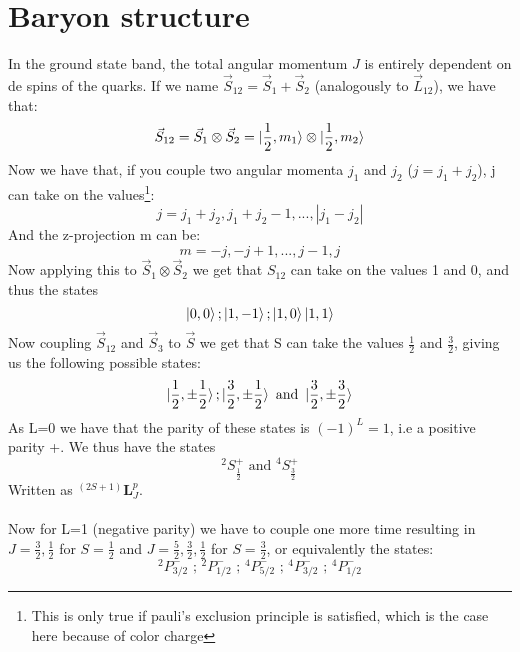 \documentclass[10pt,a4paper,twoside]{article}
\begin{document}
\section{Baryon structure}
In the ground state band, the total angular momentum $J$ is entirely dependent on de spins of the quarks. If we name $\vec{S}_{12} = \vec{S}_1 + \vec{S}_2$ (analogously to $\vec{L}_{12}$), we have that:
\begin{equation*}
	\vec{S}_{12} = \vec{S}_1\otimes\vec{S}_2 = \ket{\frac{1}{2},m_1}\otimes\ket{\frac{1}{2},m_2}
\end{equation*}
Now we have that, if you couple two angular momenta $j_1$ and $j_2$ ($j=j_1+j_2$), j can take on the values\footnote{This is only true if pauli's exclusion principle is satisfied, which is the case here because of color charge}:
\begin{equation}
	j = j_1+j_2,j_1+j_2-1,...,|j_1-j_2|
\end{equation}
And the z-projection m can be:
\begin{equation}
	m = -j,-j+1,...,j-1,j
\end{equation}
Now applying this to $\vec{S}_1\otimes\vec{S}_2$ we get that $S_{12}$ can take on the values 1 and 0, and thus the states
\begin{equation*}
	\ket{0,0};\ket{1,-1};\ket{1,0}\ket{1,1}
\end{equation*}
Now coupling $\vec{S}_{12}$ and $\vec{S}_3$ to $\vec{S}$ we get that S can take the values $\frac{1}{2}$ and $\frac{3}{2}$, giving us the following possible states:
\begin{equation}
	\ket{\frac{1}{2},\pm\frac{1}{2}};\ket{\frac{3}{2},\pm\frac{1}{2}}\text{ and }\ket{\frac{3}{2},\pm\frac{3}{2}}
\end{equation}
As L=0 we have that the parity of these states is $(-1)^L = 1$, i.e a positive parity +. We thus have the states
\begin{equation}
	^2S_{\frac{1}{2}}^+ \text{ and } ^4S_{\frac{3}{2}}^+
\end{equation}
Written as $^{(2S+1)}\boldsymbol{L}_J^p$.\\\\
Now for L=1 (negative parity) we have to couple one more time resulting in $J = \frac{3}{2},\frac{1}{2}$ for $S=\frac{1}{2}$ and $J = \frac{5}{2},\frac{3}{2},\frac{1}{2}$ for $S=\frac{3}{2}$, or equivalently the states:
\begin{equation}
	^2P^-_{3/2}\text{ ; }^2P^-_{1/2}\text{ ; }^4P^-_{5/2}\text{ ; }^4P^-_{3/2}\text{ ; }^4P^-_{1/2}
\end{equation}


\end{document}
